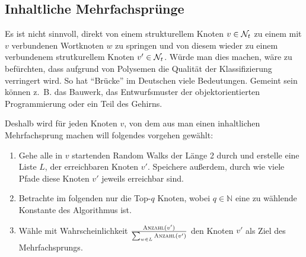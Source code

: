 \subsection{Inhaltliche Mehrfachsprünge}
Es ist nicht sinnvoll, direkt von einem strukturellem Knoten 
$v \in \mathcal{N}_t$ zu einem mit $v$ verbundenen Wortknoten $w$ zu springen
und von diesem wieder zu einem verbundenem strutkurellem Knoten 
$v' \in \mathcal{N}_t$. Würde man dies machen, wäre zu befürchten, dass
aufgrund von Polysemen die Qualität der Klassifizierung verringert
wird. So hat \enquote{Brücke} im Deutschen viele Bedeutungen.
Gemeint sein können z.~B. das Bauwerk, das Entwurfsmuster der
objektorientierten Programmierung oder ein Teil des Gehirns.

Deshalb wird für jeden Knoten $v$, von dem aus man einen inhaltlichen
Mehrfachsprung machen will folgendes vorgehen gewählt:
\begin{enumerate}
    \item Gehe alle in $v$ startenden Random Walks der Länge 2 durch
          und erstelle eine Liste $L$, der erreichbaren Knoten $v'$. Speichere
          außerdem, durch wie viele Pfade diese Knoten $v'$ jeweils erreichbar sind.
    \item Betrachte im folgenden nur die Top-$q$ Knoten, wobei $q \in \mathbb{N}$
          eine zu wählende Konstante des Algorithmus ist.
    \item Wähle mit Wahrscheinlichkeit $\frac{\Call{Anzahl}{v'}}{\sum_{w \in L} \Call{Anzahl}{v'}}$
          den Knoten $v'$ als Ziel des Mehrfachsprungs.
\end{enumerate}


